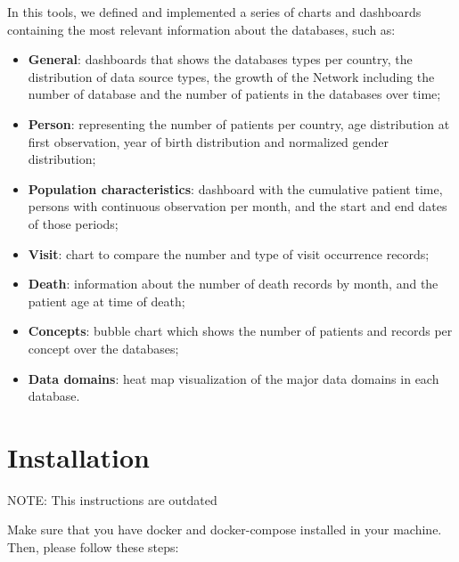 \documentclass[]{book}
\providecommand{\tightlist}{%
  \setlength{\itemsep}{0pt}\setlength{\parskip}{0pt}}
\begin{document}
In this tools, we defined and implemented a series of charts and
dashboards containing the most relevant information about the databases,
such as:

\begin{itemize}
\tightlist
\item
  \textbf{General}: dashboards that shows the databases types per
  country, the distribution of data source types, the growth of the
  Network including the number of database and the number of patients in
  the databases over time;
\item
  \textbf{Person}: representing the number of patients per country, age
  distribution at first observation, year of birth distribution and
  normalized gender distribution;
\item
  \textbf{Population characteristics}: dashboard with the cumulative
  patient time, persons with continuous observation per month, and the
  start and end dates of those periods;
\item
  \textbf{Visit}: chart to compare the number and type of visit
  occurrence records;
\item
  \textbf{Death}: information about the number of death records by
  month, and the patient age at time of death;
\item
  \textbf{Concepts}: bubble chart which shows the number of patients and
  records per concept over the databases;
\item
  \textbf{Data domains}: heat map visualization of the major data
  domains in each database.
\end{itemize}

\chapter{Installation}\label{installation}

NOTE: This instructions are outdated

Make sure that you have docker and docker-compose installed in your
machine. Then, please follow these steps:
\end{document}
